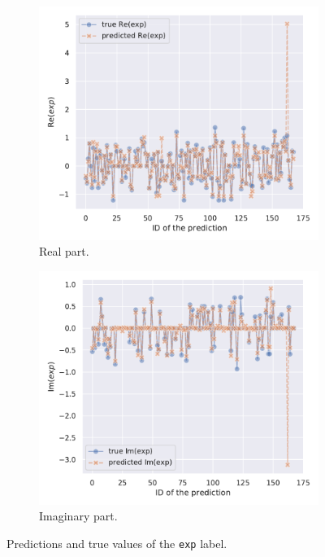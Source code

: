 \begin{figure}[htbp]
  \centering
  \begin{subfigure}{0.45\textwidth}
    \centering
    \includegraphics[width=\linewidth]{img/ann_model_test_re_lineplot}
    \caption{Real part.}
  \end{subfigure}
  \begin{subfigure}{0.45\textwidth}
    \centering
    \includegraphics[width=\linewidth]{img/ann_model_test_im_lineplot}
    \caption{Imaginary part.}
  \end{subfigure}
  \caption{Predictions and true values of the \texttt{exp} label.}
  \label{fig:wzw:preds}
\end{figure}


